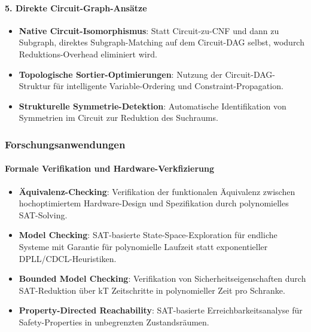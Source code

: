 ﻿\documentclass[a4paper,12pt]{article}
\theoremstyle{definition}
\begin{document}
\paragraph{5. Direkte Circuit-Graph-Ansätze}

\begin{itemize}
	\item \textbf{Native Circuit-Isomorphismus}: Statt Circuit-zu-CNF und dann zu Subgraph, direktes Subgraph-Matching auf dem Circuit-DAG selbst, wodurch Reduktions-Overhead eliminiert wird.
	
	\item \textbf{Topologische Sortier-Optimierungen}: Nutzung der Circuit-DAG-Struktur für intelligente Variable-Ordering und Constraint-Propagation.
	
	\item \textbf{Strukturelle Symmetrie-Detektion}: Automatische Identifikation von Symmetrien im Circuit zur Reduktion des Suchraums.
\end{itemize}

\subsubsection{Forschungsanwendungen}

\paragraph{Formale Verifikation und Hardware-Verkfizierung}

\begin{itemize}
	\item \textbf{Äquivalenz-Checking}: Verifikation der funktionalen Äquivalenz zwischen hochoptimiertem Hardware-Design und Spezifikation durch polynomielles SAT-Solving.
	
	\item \textbf{Model Checking}: SAT-basierte State-Space-Exploration für endliche Systeme mit Garantie für polynomielle Laufzeit statt exponentieller DPLL/CDCL-Heuristiken.
	
	\item \textbf{Bounded Model Checking}: Verifikation von Sicherheitseigenschaften durch SAT-Reduktion über kT Zeitschritte in polynomieller Zeit pro Schranke.
	
	\item \textbf{Property-Directed Reachability}: SAT-basierte Erreichbarkeitsanalyse für Safety-Properties in unbegrenzten Zustandsräumen.
\end{itemize}
\end{document}

